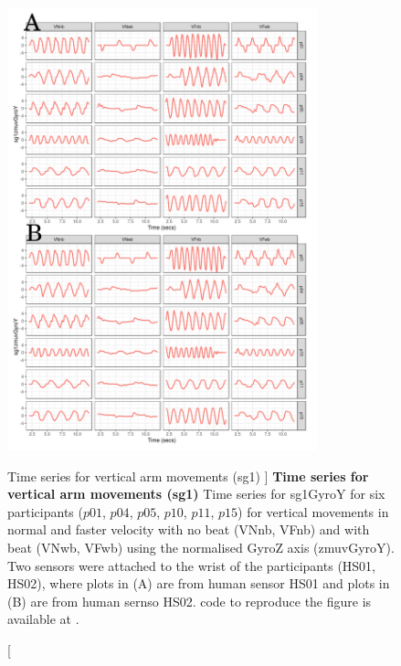 \begin{figure}
\centering
\includegraphics[width=0.8\textwidth]{ts_V_sg1}
	\caption
	[Time series for vertical arm movements (sg1) ]{
	{\bf Time series for vertical arm movements (sg1)}
		Time series for sg1GyroY for six participants 
		($p01$, $p04$, $p05$, $p10$, $p11$, $p15$) 
		for vertical movements in normal and faster velocity with
		no beat	(VNnb, VFnb) and with beat (VNwb, VFwb) using 
		the normalised GyroZ axis (zmuvGyroY).
		Two sensors were attached to the wrist of the participants (HS01, HS02),
		where plots in (A) are from human sensor HS01 and
		plots in (B) are from human sernso HS02.
	\R code to reproduce the figure is available at 
	.
	}
    \label{fig:tssg1gyroY-hii}
\end{figure}


